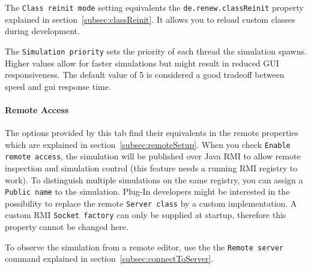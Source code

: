The \texttt{Class reinit mode} setting equivalents the
\texttt{de.renew.classReinit} property explained in
section~\ref{subsec:classReinit}.
It allows you to reload custom classes during development.

The \texttt{Simulation priority} sets the priority of each thread the simulation 
spawns. 
Higher values allow for faster simulations but might result in reduced GUI responsiveness.
The default value of 5 is considered a good tradeoff between speed and gui response time.

\paragraph{Remote Access}
The options provided by this tab find their equivalents in the
remote properties which are explained in
section~\ref{subsec:remoteSetup}.
When you check \texttt{Enable remote access}, the simulation will
be published over Java RMI to allow remote inspection and
simulation control (this feature needs a running RMI registry to
work).
To distinguish multiple simulations on the same registry, you can
assign a \texttt{Public name} to the simulation.
Plug-In developers might be interested in the possibility to
replace the remote \texttt{Server class} by a custom
implementation.
A custom RMI \texttt{Socket factory} can only be supplied at startup,
therefore this property cannot be changed here.

To observe the simulation from a remote editor, use the the
\texttt{Remote server} command explained in
section~\ref{subsec:connectToServer}.


